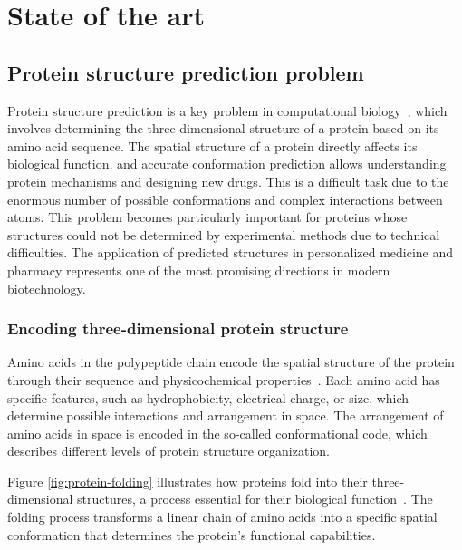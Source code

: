 \chapter{State of the art}

\section{Protein structure prediction problem}
Protein structure prediction is a key problem in computational biology~\cite{alphafold3}, which involves determining the three-dimensional structure of a protein based on its amino acid sequence.
The spatial structure of a protein directly affects its biological function, and accurate conformation prediction allows understanding protein mechanisms and designing new drugs.
This is a difficult task due to the enormous number of possible conformations and complex interactions between atoms.
This problem becomes particularly important for proteins whose structures could not be determined by experimental methods due to technical difficulties.
The application of predicted structures in personalized medicine and pharmacy represents one of the most promising directions in modern biotechnology.

\subsection{Encoding three-dimensional protein structure}
Amino acids in the polypeptide chain encode the spatial structure of the protein through their sequence and physicochemical properties~\cite{protein_folding}.
Each amino acid has specific features, such as hydrophobicity, electrical charge, or size, which determine possible interactions and arrangement in space.
The arrangement of amino acids in space is encoded in the so-called conformational code, which describes different levels of protein structure organization.

Figure \ref{fig:protein-folding} illustrates how proteins fold into their three-dimensional structures, a process essential for their biological function~\cite{dill2012protein}.
The folding process transforms a linear chain of amino acids into a specific spatial conformation that determines the protein's functional capabilities.

